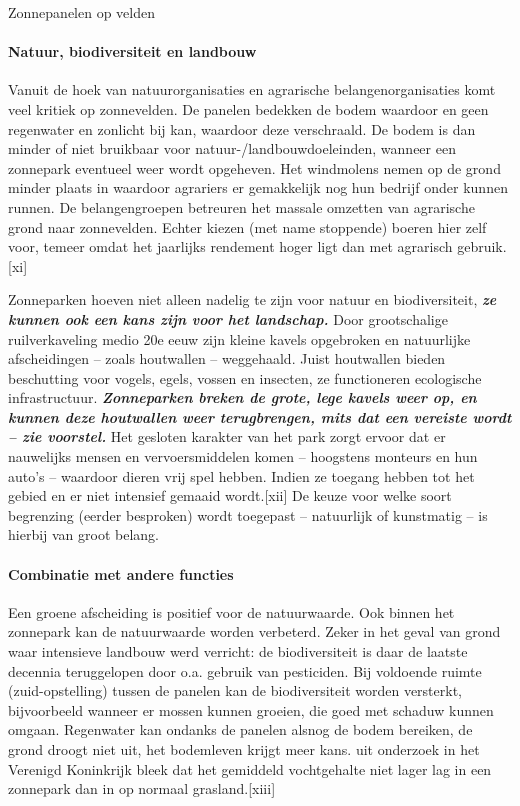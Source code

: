 \begin{voorstel}{Zonnepanelen op velden}
\begin{overwegingen}
\begin{itemize}
\end{itemize}

\paragraph{Natuur, biodiversiteit en landbouw}
Vanuit de hoek van natuurorganisaties en agrarische belangenorganisaties komt veel kritiek op zonnevelden. De panelen bedekken de bodem waardoor en geen regenwater en zonlicht bij kan, waardoor deze verschraald. De bodem is dan minder of niet bruikbaar voor natuur-/landbouwdoeleinden, wanneer een zonnepark eventueel weer wordt opgeheven. Het windmolens nemen op de grond minder plaats in waardoor agrariers er gemakkelijk nog hun bedrijf onder kunnen runnen. De belangengroepen betreuren het massale omzetten van agrarische grond naar zonnevelden. Echter kiezen (met name stoppende) boeren hier zelf voor, temeer omdat het jaarlijks rendement hoger ligt dan met agrarisch gebruik.[xi]

Zonneparken hoeven niet alleen nadelig te zijn voor natuur en biodiversiteit, \textbf{\em{ze kunnen ook een kans zijn voor het landschap.}} Door grootschalige ruilverkaveling medio 20e eeuw zijn kleine kavels opgebroken en natuurlijke afscheidingen – zoals houtwallen – weggehaald. Juist houtwallen bieden beschutting voor vogels, egels, vossen en insecten, ze functioneren ecologische infrastructuur. \textbf{\em{Zonneparken breken de grote, lege kavels weer op, en kunnen deze houtwallen weer terugbrengen, mits dat een vereiste wordt – zie voorstel.}} Het gesloten karakter van het park zorgt ervoor dat er nauwelijks mensen en vervoersmiddelen komen – hoogstens monteurs en hun auto’s – waardoor dieren vrij spel hebben. Indien ze toegang hebben tot het gebied en er niet intensief gemaaid wordt.[xii] De keuze voor welke soort begrenzing (eerder besproken) wordt toegepast – natuurlijk of kunstmatig – is hierbij van groot belang.

\paragraph{Combinatie met andere functies}
Een groene afscheiding is positief voor de natuurwaarde. Ook binnen het zonnepark kan de natuurwaarde worden verbeterd. Zeker in het geval van grond waar intensieve landbouw werd verricht: de biodiversiteit is daar de laatste decennia teruggelopen door o.a. gebruik van pesticiden. Bij voldoende ruimte (zuid-opstelling) tussen de panelen kan de biodiversiteit worden versterkt, bijvoorbeeld wanneer er mossen kunnen groeien, die goed met schaduw kunnen omgaan. Regenwater kan ondanks de panelen alsnog de bodem bereiken, de grond droogt niet uit, het bodemleven krijgt meer kans. uit onderzoek in het Verenigd Koninkrijk bleek dat het gemiddeld vochtgehalte niet lager lag in een zonnepark dan in op normaal grasland.[xiii]


\end{overwegingen}
\end{voorstel}
